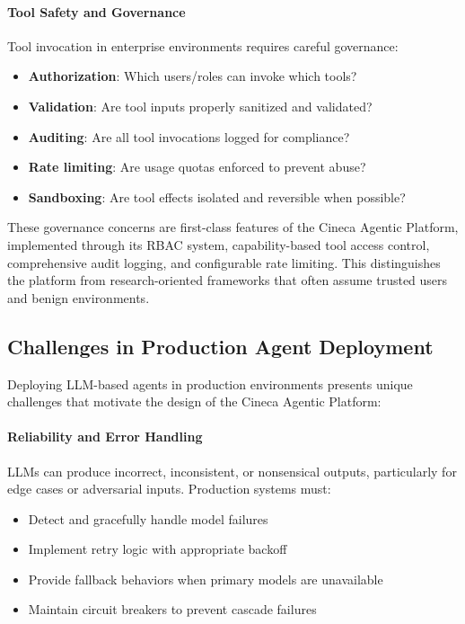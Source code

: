 \paragraph{Tool Safety and Governance}
Tool invocation in enterprise environments requires careful governance:
\begin{itemize}
    \item \textbf{Authorization}: Which users/roles can invoke which tools?
    \item \textbf{Validation}: Are tool inputs properly sanitized and validated?
    \item \textbf{Auditing}: Are all tool invocations logged for compliance?
    \item \textbf{Rate limiting}: Are usage quotas enforced to prevent abuse?
    \item \textbf{Sandboxing}: Are tool effects isolated and reversible when possible?
\end{itemize}

These governance concerns are first-class features of the Cineca Agentic Platform, implemented through its RBAC system, capability-based tool access control, comprehensive audit logging, and configurable rate limiting. This distinguishes the platform from research-oriented frameworks that often assume trusted users and benign environments.

\subsection{Challenges in Production Agent Deployment}

Deploying LLM-based agents in production environments presents unique challenges that motivate the design of the Cineca Agentic Platform:

\paragraph{Reliability and Error Handling}
LLMs can produce incorrect, inconsistent, or nonsensical outputs, particularly for edge cases or adversarial inputs. Production systems must:
\begin{itemize}
    \item Detect and gracefully handle model failures
    \item Implement retry logic with appropriate backoff
    \item Provide fallback behaviors when primary models are unavailable
    \item Maintain circuit breakers to prevent cascade failures
\end{itemize}

